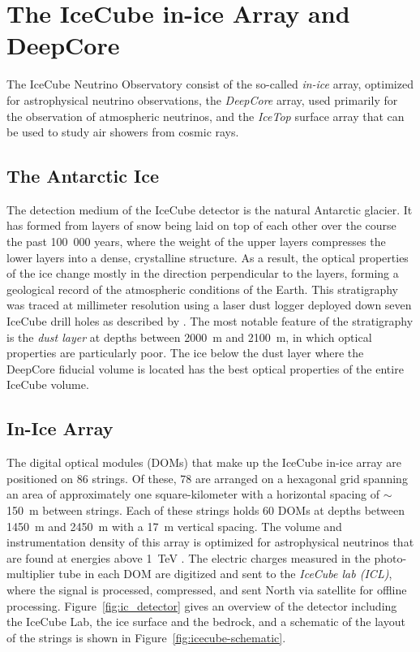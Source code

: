 \section{The IceCube in-ice Array and DeepCore}

The IceCube Neutrino Observatory consist of the so-called \emph{in-ice} array, optimized for astrophysical neutrino observations, the \emph{DeepCore} array, used primarily for the observation of atmospheric neutrinos, and the \emph{IceTop} surface array that can be used to study air showers from cosmic rays.

\subsection{The Antarctic Ice}

The detection medium of the IceCube detector is the natural Antarctic glacier. It has formed from layers of snow being laid on top of each other over the course the past 100~000 years, where the weight of the upper layers compresses the lower layers into a dense, crystalline structure. As a result, the optical properties of the ice change mostly in the direction perpendicular to the layers, forming a geological record of the atmospheric conditions of the Earth. This stratigraphy was traced at millimeter resolution using a laser dust logger deployed down seven IceCube drill holes as described by \cite{dustlogger}. The most notable feature of the stratigraphy is the \emph{dust layer} at depths between 2000~m and 2100~m, in which optical properties are particularly poor. The ice below the dust layer where the DeepCore fiducial volume is located has the best optical properties of the entire IceCube volume.

\subsection{In-Ice Array}
The digital optical modules (DOMs) that make up the IceCube in-ice array are positioned on 86 strings. Of these, 78 are arranged on a hexagonal grid spanning an area of approximately one square-kilometer with a horizontal spacing of $\sim$150~m between strings. Each of these strings holds 60 DOMs at depths between 1450~m and 2450~m with a 17~m vertical spacing. The volume and instrumentation density of this array is optimized for astrophysical neutrinos that are found at energies above 1~TeV \cite{icecube_detector_17}.
The electric charges measured in the photo-multiplier tube in each DOM are digitized  and sent to the \emph{IceCube lab (ICL)}, where the signal is processed, compressed, and sent North via satellite for offline processing. Figure~\ref{fig:ic_detector} gives an overview of the detector including the IceCube Lab, the ice surface and the bedrock, and a schematic of the layout of the strings is shown in Figure~\ref{fig:icecube-schematic}.

